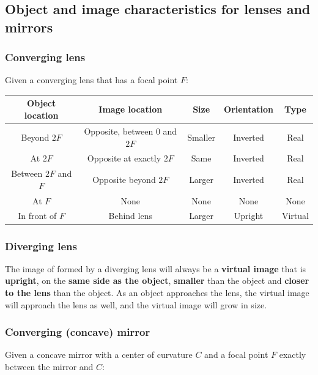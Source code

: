\documentclass[12pt]{article}
\begin{document}
\newpage

\subsection{Object and image characteristics for lenses and mirrors}

\subsubsection{Converging lens}

Given a converging lens that has a focal point $F$:

\begin{center}
\begin{tabular}{ |c|c|c|c|c| } 
 \hline
 Object location & Image location & Size & Orientation & Type\\
 \hline
 \hline
 Beyond $2F$ & Opposite, between $0$ and $2F$ & Smaller & Inverted & Real\\
 \hline
 At $2F$ & Opposite at exactly $2F$ & Same & Inverted & Real\\
 \hline
 Between $2F$ and $F$ & Opposite beyond $2F$ & Larger & Inverted & Real\\
 \hline
 At $F$ & None & None & None & None\\
 \hline
 In front of $F$ & Behind lens & Larger & Upright & Virtual\\
 \hline
\end{tabular}
\end{center}

\subsubsection{Diverging lens}

The image of formed by a diverging lens will always be a \textbf{virtual image} that is \textbf{upright}, on the \textbf{same side as the object}, \textbf{smaller} than the object and \textbf{closer to the lens} than the object.
As an object approaches the lens, the virtual image will approach the lens as well, and the virtual image will grow in size.

\subsubsection{Converging (concave) mirror}

Given a concave mirror with a center of curvature $C$ and a focal point $F$ exactly between the mirror and $C$:
\end{document}
